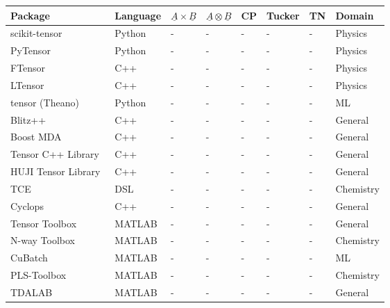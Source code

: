 \documentclass[10pt]{article}
\makeatletter
\newcommand{\ccell}[3][]{%
  \kern-\fboxsep
  \if\relax\detokenize{#1}\relax
    \expandafter\@firstoftwo
  \else
    \expandafter\@secondoftwo
  \fi
  {\colorbox{#2}}%
  {\colorbox[#1]{#2}}%
  {#3}\kern-\fboxsep
}
\newcommand{\yesy}{\ccell{green}{Y}}
\newcommand{\non}{\ccell{red}{N}}
\makeatother
\begin{document}
\begin{center}
    \begin{tabular}{ | l | l | l | l | l | l | l | l |}
    \hline
    Package 					
    & Language & $\underline{A} \times \underline{B}$ & $\underline{A} \otimes \underline{B}$ & CP & Tucker & TN & Domain \\ \hline
    scikit-tensor					
    & Python & \yesy & \yesy & \yesy & \yesy & \non & Physics \\ \hline
    PyTensor				
    & Python & \yesy & \yesy & \non & \non & \non & Physics \\ \hline
    FTensor~\cite{Landry:2003:IHP:1240120.1240122,FTensor}					
    & C++ & \yesy & \yesy & \non & \non & \non & Physics \\ \hline
    LTensor~\cite{LTensor} 		
    & C++ & \yesy & \yesy & \yesy & \yesy & \non & Physics \\ \hline
    tensor (Theano) 			
    & Python & \yesy & \yesy & \yesy & \yesy & \non & ML \\ \hline
    Blitz++~\cite{blitz} 
    & C++ & \yesy & \yesy & \yesy & \yesy & \non & General \\ \hline
    Boost MDA~\cite{boost-multiarray} 
    & C++ & \yesy & \yesy & \yesy & \yesy & \non & General \\ \hline
    Tensor C++ Library~\cite{tensorCPP} 			
    & C++ & \yesy & \yesy & \yesy & \yesy & \non & General \\ \hline
    HUJI Tensor Library~\cite{huji} 		
    & C++ & \yesy & \yesy & \yesy & \yesy & \non & General \\ \hline
    TCE~\cite{TCE}
    & DSL & \yesy & \yesy & \yesy & \yesy & \non & Chemistry \\ \hline
    Cyclops~\cite{CTF}
    & C++ & \yesy & \yesy & \yesy & \yesy & \non & General \\ \hline
    Tensor Toolbox~\cite{TensorToolbox}
    & MATLAB & \yesy & \yesy & \yesy & \yesy & \non & General \\ \hline
    N-way Toolbox~\cite{Nway-Paper,Nway}
    & MATLAB & \yesy & \yesy & \yesy & \yesy & \non & Chemistry \\ \hline
    CuBatch~\cite{CuBatch}
    & MATLAB & \yesy & \yesy & \yesy & \yesy & \non & ML \\ \hline
    PLS-Toolbox~\cite{PLS-toolbox}
    & MATLAB & \yesy & \yesy & \non & \yesy & \non & Chemistry \\ \hline
    TDALAB~\cite{TDALAB,TDALAB_online}
    & MATLAB & \yesy & \yesy & \yesy & \yesy & \non & General \\ \hline

\end{tabular}
\end{center}
\end{document}

